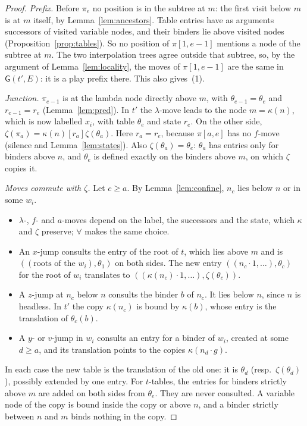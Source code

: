 \documentclass[11pt]{article}
\newcommand{\Gm}{\mathsf{G}}
\newcommand{\suc}[2]{#1{\cdot}#2}
\newcommand{\iv}[2]{\pi[#1,#2]}
\theoremstyle{plain}
\theoremstyle{definition}
\theoremstyle{remark}
\begin{document}
\begin{proof}
\emph{Prefix.}  Before $\pi_e$ no position is in the subtree at $m$: the
first visit below $m$ is at $m$ itself, by Lemma~\ref{lem:ancestors}.
Table entries have as arguments successors of visited variable nodes,
and their binders lie above visited nodes
(Proposition~\ref{prop:tables}).  So no position of $\iv1{e-1}$ mentions
a node of the subtree at $m$.  The two interpolation trees agree outside
that subtree, so, by the argument of Lemma~\ref{lem:locality}, the
moves of $\iv1{e-1}$ are the same in $\Gm(t',E)$: it is a play prefix there.  This also gives~(1).

\emph{Junction.}  $\pi_{e-1}$ is at the lambda node directly above $m$,
with $\theta_{e-1}=\theta_e$ and $r_{e-1}=r_e$ (Lemma~\ref{lem:pred}).
In $t'$ the $\lambda$-move leads to the node $m=\kappa(n)$, which is now
labelled $x_i$, with table $\theta_e$ and state $r_e$.  On the other
side, $\zeta(\pi_a)=\kappa(n)[r_a]\zeta(\theta_a)$.  Here $r_a=r_e$,
because $\iv ae$ has no $f$-move (silence and Lemma~\ref{lem:states}).
Also $\zeta(\theta_a)=\theta_e$: $\theta_a$ has entries only for binders
above $n$, and $\theta_e$ is defined exactly on the binders above $m$,
on which $\zeta$ copies it.

\emph{Moves commute with $\zeta$.}  Let $c\ge a$.  By
Lemma~\ref{lem:confine}, $n_c$ lies below $n$ or in some $w_i$.
\begin{itemize}
\item $\lambda$-, $f$- and $a$-moves depend on the label, the successors
  and the state, which $\kappa$ and $\zeta$ preserve; $\forall$ makes the
  same choice.
\item An $x$-jump consults the entry of the root of $t$, which lies
  above $m$ and is $((\text{roots of the }w_i),\theta_1)$ on both sides.
  The new entry $((\suc{n_c}1,\dots),\theta_c)$ for the root of $w_i$
  translates to $((\suc{\kappa(n_c)}1,\dots),\zeta(\theta_c))$.
\item A $z$-jump at $n_c$ below $n$ consults the binder $b$ of $n_c$.
  It lies below $n$, since $n$ is headless.  In $t'$ the copy
  $\kappa(n_c)$ is bound by $\kappa(b)$, whose entry is the translation
  of $\theta_c(b)$.
\item A $y$- or $v$-jump in $w_i$ consults an entry for a binder of
  $w_i$, created at some $d\ge a$, and its translation points to the
  copies $\kappa(\suc{n_d}g)$.
\end{itemize}
In each case the new table is the translation of the old one: it is
$\theta_d$ (resp.\ $\zeta(\theta_d)$), possibly extended by one entry.
For $t$-tables, the entries for binders strictly above $m$ are added on
both sides from $\theta_e$.  They are never consulted.  A variable node
of the copy is bound inside the copy or above $n$, and a binder strictly
between $n$ and $m$ binds nothing in the copy.


\end{proof}
\end{document}
